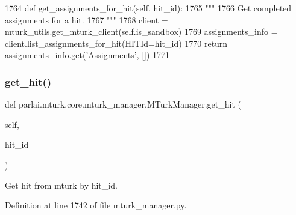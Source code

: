 \begin{DoxyCode}
1764     \textcolor{keyword}{def }get\_assignments\_for\_hit(self, hit\_id):
1765         \textcolor{stringliteral}{"""}
1766 \textcolor{stringliteral}{        Get completed assignments for a hit.}
1767 \textcolor{stringliteral}{        """}
1768         client = mturk\_utils.get\_mturk\_client(self.is\_sandbox)
1769         assignments\_info = client.list\_assignments\_for\_hit(HITId=hit\_id)
1770         \textcolor{keywordflow}{return} assignments\_info.get(\textcolor{stringliteral}{'Assignments'}, [])
1771 
\end{DoxyCode}
\mbox{\label{classparlai_1_1mturk_1_1core_1_1mturk__manager_1_1MTurkManager_ab4276a818e7845b08f9f4c08920050dc}} 
\subsubsection{\texorpdfstring{get\+\_\+hit()}{get\_hit()}}
{\footnotesize\ttfamily def parlai.\+mturk.\+core.\+mturk\+\_\+manager.\+M\+Turk\+Manager.\+get\+\_\+hit (\begin{DoxyParamCaption}\item[{}]{self,  }\item[{}]{hit\+\_\+id }\end{DoxyParamCaption})}

\begin{DoxyVerb}Get hit from mturk by hit_id.
\end{DoxyVerb}
 

Definition at line 1742 of file mturk\+\_\+manager.\+py.


